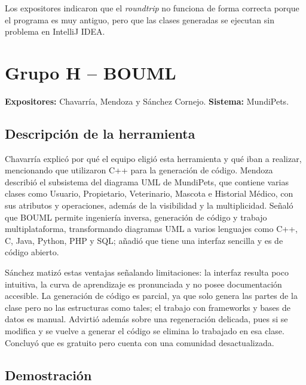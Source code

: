 \documentclass[journal,onecolumn]{IEEEtran}
\begin{document}
	Los expositores indicaron que el \textit{roundtrip} no funciona de forma correcta porque el programa es muy antiguo, pero que las clases generadas se ejecutan sin problema en IntelliJ IDEA.
	
	\section{Grupo H -- BOUML}
	
	\textbf{Expositores:} Chavarría, Mendoza y Sánchez Cornejo. \quad \textbf{Sistema:} MundiPets.
	
	\subsection{Descripción de la herramienta}
	
	Chavarría explicó por qué el equipo eligió esta herramienta y qué iban a realizar, mencionando que utilizaron C++ para la generación de código. Mendoza describió el subsistema del diagrama UML de MundiPets, que contiene varias clases como Usuario, Propietario, Veterinario, Mascota e Historial Médico, con sus atributos y operaciones, además de la visibilidad y la multiplicidad. Señaló que BOUML permite ingeniería inversa, generación de código y trabajo multiplataforma, transformando diagramas UML a varios lenguajes como C++, C, Java, Python, PHP y SQL; añadió que tiene una interfaz sencilla y es de código abierto.
	
	Sánchez matizó estas ventajas señalando limitaciones: la interfaz resulta poco intuitiva, la curva de aprendizaje es pronunciada y no posee documentación accesible. La generación de código es parcial, ya que solo genera las partes de la clase pero no las estructuras como tales; el trabajo con frameworks y bases de datos es manual. Advirtió además sobre una regeneración delicada, pues si se modifica y se vuelve a generar el código se elimina lo trabajado en esa clase. Concluyó que es gratuito pero cuenta con una comunidad desactualizada.
	
	\subsection{Demostración}
	
\end{document}
